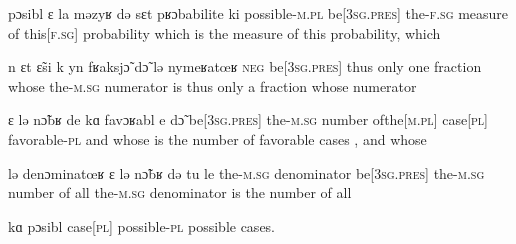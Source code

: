               {{pɔsibl{\liaison}} ɛ la məzyʁ də sɛt pʁɔbabilite ki}
              {possible-\textsc{m}.\textsc{pl} {be[3\textsc{sg}.\textsc{pres}]} the-\textsc{f}.\textsc{sg} measure of {this[\textsc{f}.\textsc{sg}]} probability which}
              {is the measure of this probability, which}

              {n {ɛt{\liaison}} \~{ɛ}si {k{\liaison}} yn fʁaksj\~{ɔ} d\~{ɔ} lə {nymeʁatœʁ\liaison}}
              {\textsc{neg} {be[3\textsc{sg}.\textsc{pres}]} thus only one fraction whose the-\textsc{m}.\textsc{sg} numerator}
              {is thus only  a fraction whose  numerator}

              {ɛ lə n\~{ɔ}bʁ de kɑ favɔʁabl e d\~{ɔ}}
              {{be[3\textsc{sg}.\textsc{pres}]} the-\textsc{m}.\textsc{sg} number {of{\textunderscore}the[\textsc{m}.\textsc{pl}]} {case[\textsc{pl}]} favorable-\textsc{pl} and whose}
              {is the number of favorable cases , and whose}

              {lə {denɔminatœʁ\liaison} ɛ lə n\~{ɔ}bʁ də tu le}
              {the-\textsc{m}.\textsc{sg} denominator {be[3\textsc{sg}.\textsc{pres}]} the-\textsc{m}.\textsc{sg} number of all the-\textsc{m}.\textsc{sg}}
              {denominator is the number of all}

              {kɑ pɔsibl}
              {case[\textsc{pl}] possible-\textsc{pl}}
              {possible cases.}
